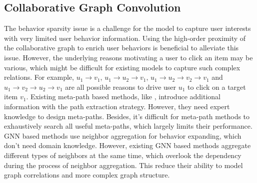 
\subsection{Collaborative Graph Convolution}\label{Collaborative Graph Convolution}
The behavior sparsity issue is a challenge for the model to capture user interests with very limited user behavior information.
Using the high-order proximity of the collaborative graph to enrich user behaviors is beneficial to alleviate this issue.
However, the underlying reasons motivating a user to click an item may be various, which might be difficult for existing models to capture such complex relations.
For example, $u_1 \rightarrow v_1$, $u_1 \rightarrow u_2 \rightarrow v_1$, $u_1 \rightarrow u_2 \rightarrow v_2 \rightarrow v_1$ and $u_1 \rightarrow v_2 \rightarrow u_2 \rightarrow v_1$
are all possible reasons to drive user $u_1$ to click on a target item $v_1$.
Existing meta-path based methods, like \cite{hu2018leveraging,wang2019heterogeneous}, introduce additional information with the path extraction strategy.
However, they need expert knowledge to design meta-paths.
Besides, it's difficult for meta-path methods to exhaustively search all useful meta-paths, which largely limits their performance.
GNN based methods use neighbor aggregation for behavior expanding, which don't need domain knowledge.
However, existing GNN based methods \cite{wang2019kgat,linmei2019heterogeneous,zhang2019heterogeneous} aggregate different types of neighbors at the same time, which overlook the dependency during the process of neighbor aggregation.
This reduce their ability to model graph correlations and more complex graph structure.
